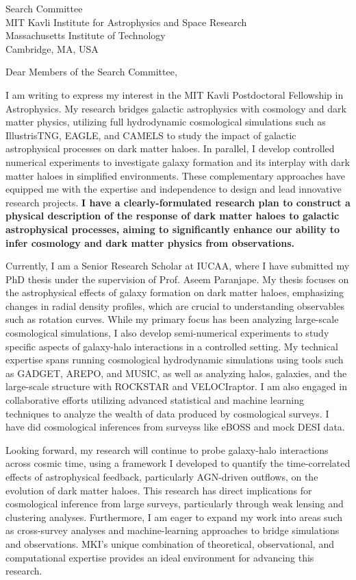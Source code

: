 \documentclass[11pt]{letter}
\begin{document}
\begin{letter}{Search Committee \\ MIT Kavli Institute for Astrophysics and Space Research \\ Massachusetts Institute of Technology \\ Cambridge, MA, USA}

\opening{Dear Members of the Search Committee,}

I am writing to express my interest in the MIT Kavli Postdoctoral Fellowship in Astrophysics. My research bridges galactic astrophysics with cosmology and dark matter physics, utilizing full hydrodynamic cosmological simulations such as IllustrisTNG, EAGLE, and CAMELS to study the impact of galactic astrophysical processes on dark matter haloes. In parallel, I develop controlled numerical experiments to investigate galaxy formation and its interplay with dark matter haloes in simplified environments. These complementary approaches have equipped me with the expertise and independence to design and lead innovative research projects. \textbf{I have a clearly-formulated research plan to construct a physical description of the response of dark matter haloes to galactic astrophysical processes, aiming to significantly enhance our ability to infer cosmology and dark matter physics from observations.}

Currently, I am a Senior Research Scholar at IUCAA, where I have submitted my PhD thesis under the supervision of Prof. Aseem Paranjape. My thesis focuses on the astrophysical effects of galaxy formation on dark matter haloes, emphasizing changes in radial density profiles, which are crucial to understanding observables such as rotation curves. While my primary focus has been analyzing large-scale cosmological simulations, I also develop semi-numerical experiments to study specific aspects of galaxy-halo interactions in a controlled setting. My technical expertise spans running cosmological hydrodynamic simulations using tools such as GADGET, AREPO, and MUSIC, as well as analyzing halos, galaxies, and the large-scale structure with ROCKSTAR and VELOCIraptor. I am also engaged in collaborative efforts utilizing advanced statistical and machine learning techniques to analyze the wealth of data produced by cosmological surveys. I have did cosmological inferences from surveyss like eBOSS and mock DESI data.

Looking forward, my research will continue to probe galaxy-halo interactions across cosmic time, using a framework I developed to quantify the time-correlated effects of astrophysical feedback, particularly AGN-driven outflows, on the evolution of dark matter haloes. This research has direct implications for cosmological inference from large surveys, particularly through weak lensing and clustering analyses. Furthermore, I am eager to expand my work into areas such as cross-survey analyses and machine-learning approaches to bridge simulations and observations. MKI's unique combination of theoretical, observational, and computational expertise provides an ideal environment for advancing this research.


\end{letter}
\end{document}
